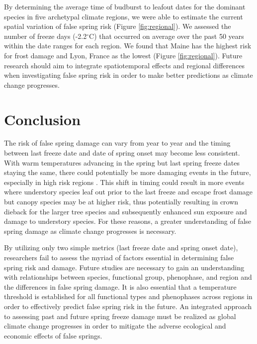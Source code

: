 \documentclass{article}\usepackage[]{graphicx}\usepackage[]{color}
\begin{document}
By determining the average time of budburst to leafout dates for the dominant species in five archetypal climate regions, we were able to estimate the current spatial variation of false spring risk (Figure \ref{fig:regional}). We assessed the number of freeze days (-2.2$^{\circ}$C) \citep{Schwartz1993} that occurred on average over the past 50 years within the date ranges for each region. We found that Maine has the highest risk for frost damage and Lyon, France as the lowest (Figure \ref{fig:regional}). Future research should aim to integrate spatiotemporal effects and regional differences when investigating false spring risk in order to make better predictions as climate change progresses.

\section{Conclusion}
The risk of false spring damage can vary from year to year and the timing between last freeze date and date of spring onset may become less consistent. With warm temperatures advancing in the spring but last spring freeze dates staying the same, there could potentially be more damaging events in the future, especially in high risk regions \citep{Gu2008, Inouye2008}. This shift in timing could result in more events where understory species leaf out prior to the last freeze and escape frost damage but canopy species may be at higher risk, thus potentially resulting in crown dieback for the larger tree species and subsequently enhanced sun exposure and damage to understory species. For these reasons, a greater understanding of false spring damage as climate change progresses is necessary.

By utilizing only two simple metrics (last freeze date and spring onset date), researchers fail to assess the myriad of factors essential in determining false spring risk and damage. Future studies are necessary to gain an understanding with relationships between species, functional group, phenophase, and region and the differences in false spring damage. It is also essential that a temperature threshold is established for all functional types and phenophases across regions in order to effectively predict false spring risk in the future. An integrated approach to assessing past and future spring freeze damage must be realized as global climate change progresses in order to mitigate the adverse ecological and economic effects of false springs.


\end{document}
